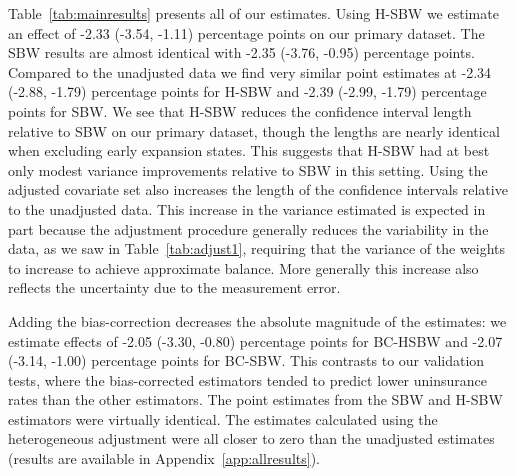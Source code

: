 \documentclass[aoas]{imsart}
\theoremstyle{plain}
\theoremstyle{remark}
\begin{document}
Table~\ref{tab:mainresults} presents all of our estimates. Using H-SBW we estimate an effect of -2.33 (-3.54, -1.11) percentage points on our primary dataset. The SBW results are almost identical with -2.35 (-3.76, -0.95) percentage points. Compared to the unadjusted data we find very similar point estimates at -2.34 (-2.88, -1.79) percentage points for H-SBW and -2.39 (-2.99, -1.79) percentage points for SBW. We see that H-SBW reduces the confidence interval length relative to SBW on our primary dataset, though the lengths are nearly identical when excluding early expansion states. This suggests that H-SBW had at best only modest variance improvements relative to SBW in this setting. Using the adjusted covariate set also increases the length of the confidence intervals relative to the unadjusted data. This increase in the variance estimated is expected in part because the adjustment procedure generally reduces the variability in the data, as we saw in Table~\ref{tab:adjust1}, requiring that the variance of the weights to increase to achieve approximate balance. More generally this increase also reflects the uncertainty due to the measurement error.

Adding the bias-correction decreases the absolute magnitude of the estimates: we estimate effects of -2.05 (-3.30, -0.80) percentage points for BC-HSBW and -2.07 (-3.14, -1.00) percentage points for BC-SBW. This contrasts to our validation tests, where the bias-corrected estimators tended to predict lower uninsurance rates than the other estimators. The point estimates from the SBW and H-SBW estimators were virtually identical. The estimates calculated using the heterogeneous adjustment were all closer to zero than the unadjusted estimates (results are available in Appendix~\ref{app:allresults}).
\end{document}
